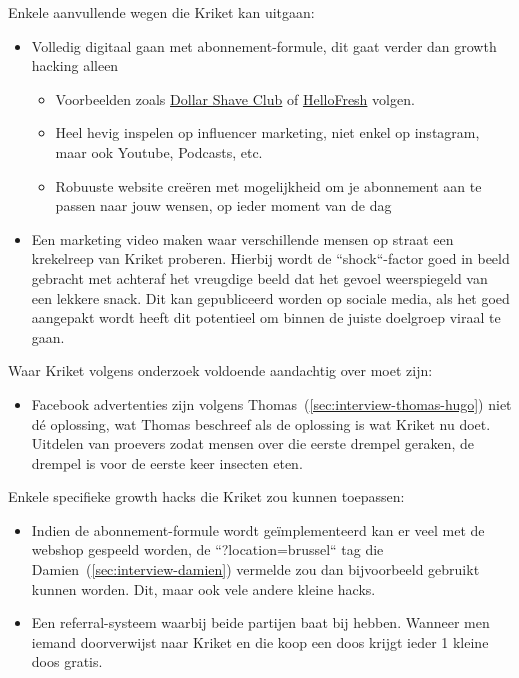 Enkele aanvullende wegen die Kriket kan uitgaan:
\begin{itemize}
	\item Volledig digitaal gaan met abonnement-formule, dit gaat verder dan growth hacking alleen
	\begin{itemize}
		\item Voorbeelden zoals \href{https://www.dollarshaveclub.com/}{Dollar Shave Club} of \href{https://www.hellofresh.be/}{HelloFresh} volgen.
		\item Heel hevig inspelen op influencer marketing, niet enkel op instagram, maar ook Youtube, Podcasts, etc.
		\item Robuuste website creëren met mogelijkheid om je abonnement aan te passen naar jouw wensen, op ieder moment van de dag
	\end{itemize}
	\item Een marketing video maken waar verschillende mensen op straat een krekelreep van Kriket proberen. Hierbij wordt de ``shock``-factor goed in beeld gebracht met achteraf het vreugdige beeld dat het gevoel weerspiegeld van een lekkere snack. Dit kan gepubliceerd worden op sociale media, als het goed aangepakt wordt heeft dit potentieel om binnen de juiste doelgroep viraal te gaan.
\end{itemize}

Waar Kriket volgens onderzoek voldoende aandachtig over moet zijn:
\begin{itemize}
	\item Facebook advertenties zijn volgens Thomas~(\ref{sec:interview-thomas-hugo}) niet dé oplossing, wat Thomas beschreef als de oplossing is wat Kriket nu doet. Uitdelen van proevers zodat mensen over die eerste drempel geraken, de drempel is voor de eerste keer insecten eten.
\end{itemize}

Enkele specifieke growth hacks die Kriket zou kunnen toepassen:
\begin{itemize}
	\item Indien de abonnement-formule wordt geïmplementeerd kan er veel met de webshop gespeeld worden, de ``?location=brussel`` tag die Damien~(\ref{sec:interview-damien}) vermelde zou dan bijvoorbeeld gebruikt kunnen worden. Dit, maar ook vele andere kleine hacks.
	\item Een referral-systeem waarbij beide partijen baat bij hebben. Wanneer men iemand doorverwijst naar Kriket en die koop een doos krijgt ieder 1 kleine doos gratis.
\end{itemize}

